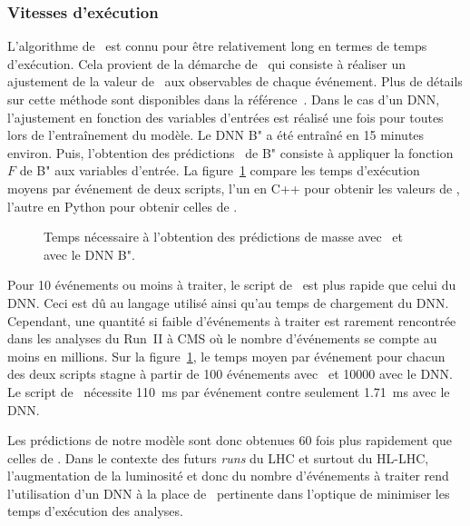 \subsubsection{Vitesses d'exécution}
L'algorithme de \SVFIT\ est connu pour être relativement long en termes de temps d'exécution.
Cela provient de la démarche de \SVFIT\
qui consiste à réaliser un ajustement de la valeur de \msv\ aux observables de chaque événement.
Plus de détails sur cette méthode sont disponibles dans la référence~\cite{SVFit_Bianchini_2014}.
Dans le cas d'un DNN, l'ajustement en fonction des variables d'entrées est réalisé une fois pour toutes lors de l'entraînement du modèle.
Le DNN B" a été entraîné en 15 minutes environ.
Puis, l'obtention des prédictions \mml\ de B" consiste à appliquer la fonction $F$ de B" aux variables d'entrée.
La figure~\ref{fig-SVFIT_vs_DNN_time}
compare les temps d'exécution moyens par événement de deux scripts,
l'un en C++ pour obtenir les valeurs de \msv,
l'autre en Python pour obtenir celles de \mml.
\begin{figure}[h]
\centering

\caption{Temps nécessaire à l'obtention des prédictions de masse avec \SVFIT\ et avec le DNN B".}
\label{fig-SVFIT_vs_DNN_time}
\end{figure}
\par
Pour 10 événements ou moins à traiter,
le script de \SVFIT\ est plus rapide que celui du DNN.
Ceci est dû au langage utilisé ainsi qu'au temps de chargement du DNN.
Cependant, une quantité si faible d'événements à traiter est rarement rencontrée dans les analyses du Run~II à CMS
où le nombre d'événements se compte au moins en millions.
Sur la figure~\ref{fig-SVFIT_vs_DNN_time},
le temps moyen par événement
pour chacun des deux scripts stagne à partir de
\num{100} événements avec \SVFIT\
et
\num{10000} avec le DNN.
Le script de \SVFIT\ nécessite \SI{110}{\milli\second} par événement
contre
seulement \SI{1.71}{\milli\second} avec le DNN.
\par
Les prédictions de notre modèle sont donc obtenues 60 fois plus rapidement que celles de \SVFIT.
Dans le contexte des futurs \emph{runs} du LHC et surtout du HL-LHC,
l'augmentation de la luminosité et donc du nombre d'événements à traiter
rend l'utilisation d'un DNN à la place de \SVFIT\ pertinente dans l'optique de minimiser les temps d'exécution des analyses.